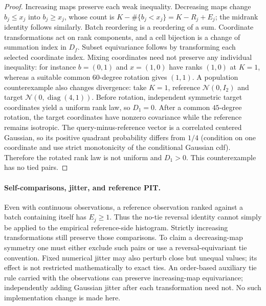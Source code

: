 {\begin{proposition}
\end{proposition}
\begin{proof}
Increasing maps preserve each weak inequality. Decreasing maps change $b_j\le x_j$ into $b_j\ge x_j$, whose count is $K-\#\{b_j<x_j\}=K-R_j+E_j$; the midrank identity follows similarly. Batch reordering is a reordering of a sum. Coordinate transformations act on rank components, and a cell bijection is a change of summation index in $D_f$. Subset equivariance follows by transforming each selected coordinate index. Mixing coordinates need not preserve any individual inequality: for instance $b=(0,1)$ and $x=(1,0)$ have ranks $(1,0)$ at $K=1$, whereas a suitable common $60$-degree rotation gives $(1,1)$. A population counterexample also changes divergence: take $K=1$, reference $\mathcal N(0,I_2)$ and target $\mathcal N(0,\operatorname{diag}(4,1))$. Before rotation, independent symmetric target coordinates yield a uniform rank law, so $D_1=0$. After a common $45$-degree rotation, the target coordinates have nonzero covariance while the reference remains isotropic. The query-minus-reference vector is a correlated centered Gaussian, so its positive quadrant probability differs from $1/4$ (condition on one coordinate and use strict monotonicity of the conditional Gaussian cdf). Therefore the rotated rank law is not uniform and $D_1>0$. This counterexample has no tied pairs.
\end{proof}

\paragraph{Self-comparisons, jitter, and reference PIT.}
Even with continuous observations, a reference observation ranked against a batch containing itself has $E_j\ge1$. Thus the no-tie reversal identity cannot simply be applied to the empirical reference-side histogram. Strictly increasing transformations still preserve those comparisons. To claim a decreasing-map symmetry one must either exclude such pairs or use a reversal-equivariant tie convention. Fixed numerical jitter may also perturb close but unequal values; its effect is not restricted mathematically to exact ties. An order-based auxiliary tie rule carried with the observations can preserve increasing-map equivariance; independently adding Gaussian jitter after each transformation need not. No such implementation change is made here.

}

